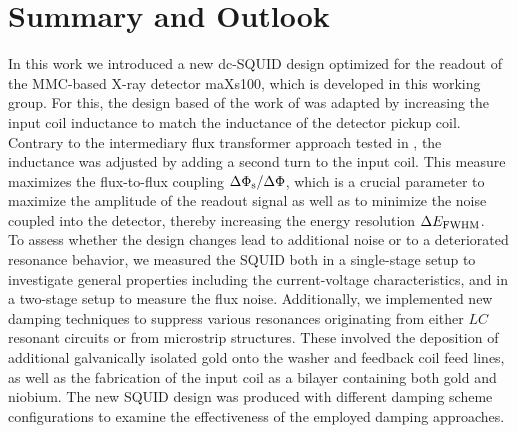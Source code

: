 \chapter{Summary and Outlook}

In this work we introduced a new dc-SQUID design optimized for the readout of the MMC-based X-ray detector maXs100, which is developed in this working group. For this, the design based of the work of \cite{Bauer2022} was adapted by increasing the input coil inductance to match the inductance of the detector pickup coil. Contrary to the intermediary flux transformer approach tested in \cite{Bauer2022}, the inductance was adjusted by adding a second turn to the input coil. This measure maximizes the flux-to-flux coupling $\Delta\Phi_{\rm s}/\Delta\Phi$, which is a crucial parameter to maximize the amplitude of the readout signal as well as to minimize the noise coupled into the detector, thereby increasing the energy resolution $\Delta E_{\rm FWHM}$. \\

To assess whether the design changes lead to additional noise or to a deteriorated resonance behavior, we measured the SQUID both in a single-stage setup to investigate general properties including the current-voltage characteristics, and in a two-stage setup to measure the flux noise. Additionally, we implemented new damping techniques to suppress various resonances originating from either $LC$ resonant circuits or from microstrip structures. These involved the deposition of additional galvanically isolated gold onto the washer and feedback coil feed lines, as well as the fabrication of the input coil as a bilayer containing both gold and niobium. The new SQUID design was produced with different damping scheme configurations to examine the effectiveness of the employed damping approaches. \\

